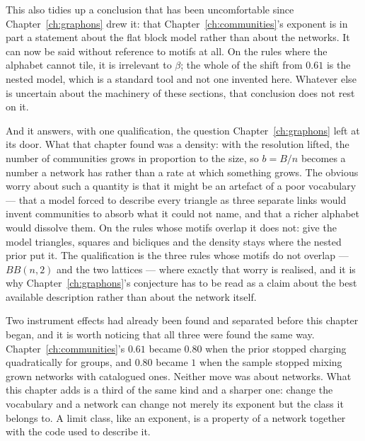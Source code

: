 This also tidies up a conclusion that has been uncomfortable since
Chapter~\ref{ch:graphons} drew it: that Chapter~\ref{ch:communities}'s exponent
is in part a statement about the flat block model rather than about the networks.
It can now be said without reference to motifs at all. On the rules where the alphabet cannot tile, it is
irrelevant to $\beta$; the whole of the shift from $0.61$ is the nested model,
which is a standard tool and not one invented here. Whatever else is uncertain
about the machinery of these sections, that conclusion does not rest on it.

And it answers, with one qualification, the question Chapter~\ref{ch:graphons}
left at its door. What that chapter found was a density: with the resolution
lifted, the number of communities grows in proportion to the size, so $b=B/n$
becomes a number a network has rather than a rate at which something grows. The
obvious worry about such a quantity is that it might be an artefact of a poor
vocabulary --- that a model forced to describe every triangle as three separate
links would invent communities to absorb what it could not name, and that a
richer alphabet would dissolve them. On the rules whose motifs overlap it does
not: give the model triangles, squares and bicliques and the density stays where
the nested prior put it. The qualification is the three rules whose motifs do not
overlap --- $BB(n,2)$ and the two lattices --- where exactly that worry is
realised, and it is why Chapter~\ref{ch:graphons}'s conjecture has to be read as
a claim about the best available description rather than about the network
itself.

Two instrument effects had already been found and separated before this chapter
began, and it is worth noticing that all three were found the same way.
Chapter~\ref{ch:communities}'s $0.61$ became $0.80$ when the prior stopped
charging quadratically for groups, and $0.80$ became $1$ when the sample stopped
mixing grown networks with catalogued ones. Neither move was about networks. What
this chapter adds is a third of the same kind and a sharper one: change the
vocabulary and a network can change not merely its exponent but the class it
belongs to. A limit class, like an exponent, is a property of a network together
with the code used to describe it.
